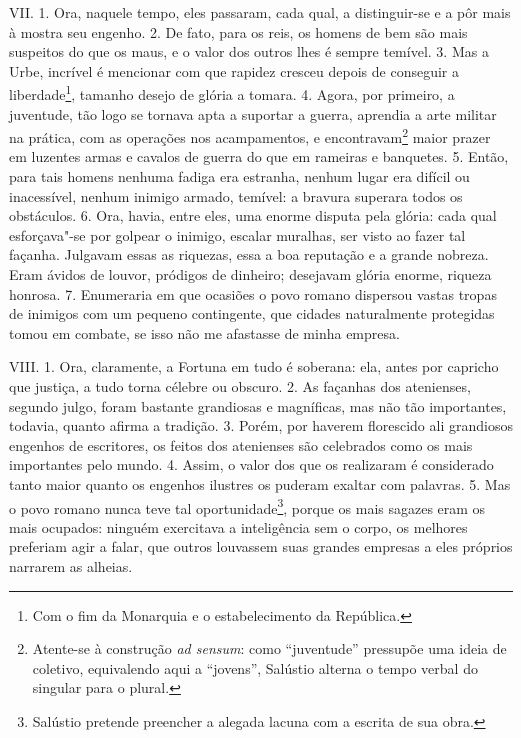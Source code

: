 VII. 1. Ora, naquele tempo, eles passaram, cada qual, a distinguir-se e a pôr
mais à mostra seu engenho. 2. De fato, para os reis, os homens de bem são mais
suspeitos do que os maus, e o valor dos outros lhes é sempre temível. 3. Mas a
Urbe, incrível é mencionar com que rapidez cresceu depois de conseguir a
liberdade\footnote{Com o fim da Monarquia e o estabelecimento da República.},
tamanho desejo de glória a tomara. 4. Agora, por primeiro, a juventude, tão
logo se tornava apta a suportar a guerra, aprendia a arte militar na prática,
com as operações nos acampamentos, e encontravam\footnote{Atente-se à
construção \emph{ad sensum}: como ``juventude'' pressupõe uma ideia de
coletivo, equivalendo aqui a ``jovens'', Salústio alterna o tempo verbal do
singular para o plural.} maior prazer em luzentes armas e cavalos de guerra do
que em rameiras e banquetes. 5. Então, para tais homens nenhuma fadiga era
estranha, nenhum lugar era difícil ou inacessível, nenhum inimigo armado,
temível: a bravura superara todos os obstáculos. 6. Ora, havia, entre eles, uma
enorme disputa pela glória: cada qual esforçava"-se por golpear o inimigo,
escalar muralhas, ser visto ao fazer tal façanha. Julgavam essas as riquezas,
essa a boa reputação e a grande nobreza. Eram ávidos de louvor, pródigos de
dinheiro; desejavam glória enorme, riqueza honrosa. 7. Enumeraria em que
ocasiões o povo romano dispersou vastas tropas de inimigos com um pequeno
contingente, que cidades naturalmente protegidas tomou em combate, se isso não
me afastasse de minha empresa.

VIII. 1. Ora, claramente, a Fortuna em tudo é soberana: ela, antes por capricho
que justiça, a tudo torna célebre ou obscuro. 2. As façanhas dos atenienses,
segundo julgo, foram bastante grandiosas e magníficas, mas não tão importantes,
todavia, quanto afirma a tradição. 3. Porém, por haverem florescido ali
grandiosos engenhos de escritores, os feitos dos atenienses são celebrados como
os mais importantes pelo mundo. 4. Assim, o valor dos que os realizaram é
considerado tanto maior quanto os engenhos ilustres os puderam exaltar com
palavras. 5. Mas o povo romano nunca teve tal oportunidade\footnote{Salústio
pretende preencher a alegada lacuna com a escrita de sua obra.}, porque os mais
sagazes eram os mais ocupados: ninguém exercitava a inteligência sem o corpo,
os melhores preferiam agir a falar, que outros louvassem suas grandes empresas
a eles próprios narrarem as alheias.

